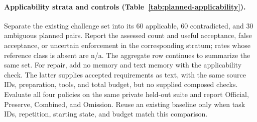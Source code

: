 \paragraph{Applicability strata and controls (Table~\ref{tab:planned-applicability}).}
Separate the existing challenge set into its 60 applicable, 60 contradicted,
and 30 ambiguous planned pairs. Report the assessed count and useful
acceptance, false acceptance, or uncertain enforcement in the corresponding
stratum; rates whose reference class is absent are n/a. The aggregate row
continues to summarize the same set.
For repair, add no memory and text memory with the applicability check.
The latter supplies accepted requirements as text, with the same source IDs,
preparation, tools, and total budget, but no supplied composed checks.
Evaluate all four policies on the same private held-out suite and report
Official, Preserve, Combined, and Omission. Reuse an existing baseline only
when task IDs, repetition, starting state, and budget match this comparison.
\endgroup
